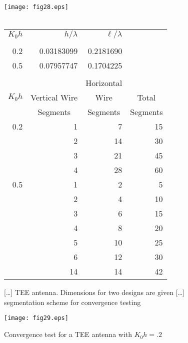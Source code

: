 \documentclass[12pt]{article}
\begin{document}
\begin{figure}[htb]
\begin{center}
\vspace*{-5mm}
\texttt{[image: fig28.eps]}\\
\ \\
\begin{tabular}{r|r|r|r}
$K_0h$ & $h/\lambda$ & $\ell/\lambda$ \\[3pt]
\cline{1-3}
       &             &                    \\[-8pt]
0.2    & 0.03183099  & 0.2181690          \\
0.5    & 0.07957747  & 0.1704225          \\
\multicolumn{4}{c}{}               \\
                                   &
                                   &
\multicolumn{1}{c|}{Horizontal}    &
                                   \\
\multicolumn{1}{c|}{$K_0h$}        &
\multicolumn{1}{c|}{Vertical Wire} &
\multicolumn{1}{c|}{Wire}          &
\multicolumn{1}{c}{Total}          \\
                                   &
\multicolumn{1}{c|}{Segments}      &
\multicolumn{1}{c|}{Segments}      &
\multicolumn{1}{c}{Segments}       \\
\hline
0.2 &  1  &  7 & 15 \\
    &  2  & 14 & 30 \\
    &  3  & 21 & 45 \\
    &  4  & 28 & 60 \\
\hline
0.5 &  1  &  2 &  5 \\
    &  2  &  4 & 10 \\
    &  3  &  6 & 15 \\
    &  4  &  8 & 20 \\
    &  5  & 10 & 25 \\
    &  6  & 12 & 30 \\
    & 14  & 14 & 42 \\
\end{tabular}
\end{center}
\caption{[\ldots] TEE antenna. Dimensions for two designs are given [\ldots]
segmentation scheme for convergence testing}
\label{fig28}
\end{figure}

\begin{sidewaysfigure}[htb]
\centerline{\texttt{[image: fig29.eps]}}
\caption{Convergence test for a TEE antenna with $K_0 h = .2$}
\label{fig29}
\end{sidewaysfigure}
\end{document}
